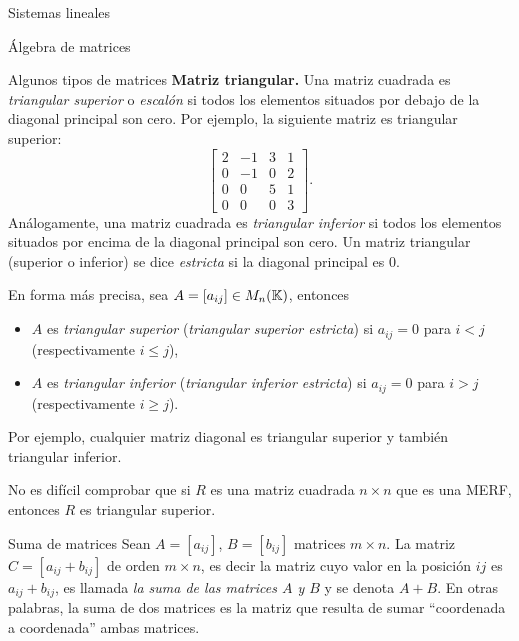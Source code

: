 \begin{chapter}{Sistemas lineales}
\begin{section}{\'Algebra de matrices}
\begin{subsection}{Algunos tipos de matrices}
                \textbf{Matriz triangular.} Una matriz cuadrada es \textit{triangular superior} o \textit{escalón} si todos los elementos situados por debajo de la diagonal principal son cero. Por ejemplo, la siguiente matriz es triangular superior:
                \begin{equation}
                \begin{bmatrix}
                2&-1&3&1\\0&-1&0&2\\0&0&5&1\\0&0&0&3
                \end{bmatrix}.
                \end{equation}
                Análogamente, una matriz cuadrada es \textit{triangular inferior} si todos los elementos situados por encima de la diagonal principal son cero. Un matriz triangular (superior o inferior) se dice \textit{estricta} si la diagonal principal es 0.
                
                En forma más precisa, sea $A =[a_{ij}]\in M_n(\mathbb K)$,  entonces
                \begin{itemize}
                    \item $A$ es \textit{triangular superior} (\textit{triangular superior estricta}) si $a_{ij} =0$ para $i < j$ (respectivamente $i \le j$),
                    \item $A$ es \textit{triangular inferior} (\textit{triangular inferior estricta}) si $a_{ij} =0$ para $i > j$ (respectivamente $i \ge j$).
                \end{itemize}
                
                Por  ejemplo, cualquier matriz diagonal es triangular superior y también triangular inferior. 
                
                No es difícil comprobar que si $R$ es una matriz cuadrada $n \times n$  que es una MERF,  entonces $R$  es triangular superior. 
                
             
            \end{subsection}
            
            
            \begin{subsection}{Suma  de matrices}
                Sean $A=[a_{ij}]$, $B=[b_{ij}]$ matrices  $m \times n$. La matriz $C= [a_{ij} + b_{ij}]$ de orden $m \times n$,  es decir la matriz cuyo valor en la posición $ij$ es  $a_{ij} + b_{ij}$, es llamada \textit{la suma de las matrices $A$ y $B$} y se denota $A+B$. En otras palabras, la suma de dos matrices es la matriz que resulta de sumar ``coordenada a coordenada'' ambas matrices. 
                

\end{subsection}
\end{section}
\end{chapter}
